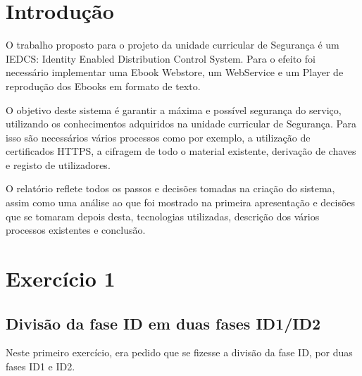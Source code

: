 \documentclass[pdftex,12pt,a4paper]{report}
\begin{document}
\renewcommand{\headrulewidth}{0pt}

\fancyhead{}
\fancyfoot{}
\rfoot{\thepage}

\renewcommand*\contentsname{Conteúdos}
\renewcommand*\figurename{Figura}
\renewcommand*\tablename{Tabela}

\tableofcontents
\renewcommand{\headrulewidth}{0.15pt}
\renewcommand{\thechapter}{}


\clearpage

\section{Introdução}
O trabalho proposto para o projeto da unidade curricular de Segurança é um IEDCS: Identity Enabled Distribution Control System. Para o  efeito foi necessário implementar uma Ebook Webstore, um WebService e um Player de reprodução dos Ebooks em formato de texto.

O objetivo deste sistema é garantir a máxima e possível segurança do serviço, utilizando os conhecimentos adquiridos na unidade curricular de Segurança. Para isso são necessários vários processos como por exemplo, a utilização de certificados HTTPS, a cifragem de todo o material existente, derivação de chaves e registo de utilizadores.	

O relatório reflete todos os passos e decisões tomadas na criação do sistema, assim como uma análise ao que foi mostrado na primeira apresentação e decisões que se tomaram depois desta, tecnologias utilizadas, descrição dos vários processos existentes e conclusão.

\newpage
\section{Exercício 1}

\subsection{Divisão da fase ID em duas fases ID1/ID2}
Neste primeiro exercício, era pedido que se fizesse a divisão da fase ID, por duas fases ID1 e ID2.
\end{document}
